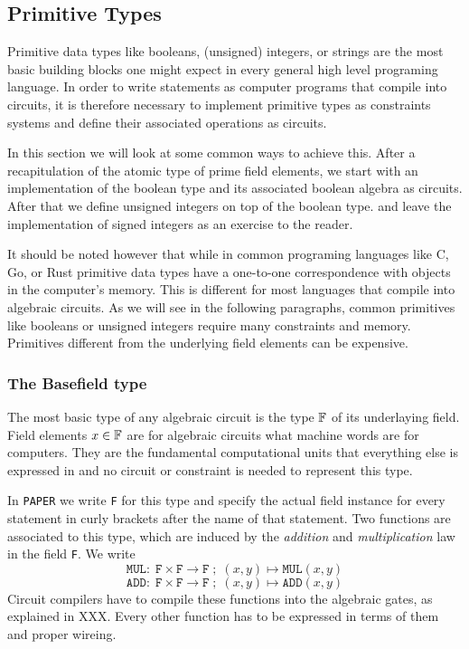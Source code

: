 \subsection{Primitive Types} 
Primitive data types like booleans, (unsigned) integers, or strings  are the most basic building blocks one might expect in every general high level programing language. In order to write statements as computer programs that compile into circuits, it is therefore necessary to implement primitive types as constraints systems and define their associated operations as circuits.

In this section we will look at some common ways to achieve this. After a recapitulation of the atomic type of prime field elements, we start with an implementation of the boolean type and its associated boolean algebra as circuits. After that we define unsigned integers on top of the boolean type. and leave the implementation of signed integers as an exercise to the reader. 

It should be noted however that while in common programing languages like C, Go, or Rust primitive data types have a one-to-one correspondence with objects in the computer's memory. This is different for most languages that compile into algebraic circuits. As we will see in the following paragraphs, common primitives like booleans or unsigned integers require many constraints and memory. Primitives different from the underlying field elements can be expensive.

\subsubsection{The Basefield type} 
The most basic type of any algebraic circuit is the type $\mathbb{F}$ of its underlaying field. Field elements $x\in\mathbb{F}$ are for algebraic circuits what machine words are for computers. They are the fundamental computational units that everything else is expressed in and no circuit or constraint is needed to represent this type. 

In \texttt{PAPER} we write \texttt{F} for this type and specify the actual field instance for every statement in curly brackets after the name of that statement. Two functions are associated to this type, which are induced by the \textit{addition} and \textit{multiplication} law in the field \texttt{F}. We write
\begin{equation}
\mathtt{MUL}:\; \mathtt{F} \times \mathtt{F} \to \mathtt{F}\;;\; (x,y) \mapsto \mathtt{MUL}(x,y)
\end{equation}
\begin{equation}
\mathtt{ADD}:\; \mathtt{F} \times \mathtt{F} \to \mathtt{F}\;;\; (x,y) \mapsto \mathtt{ADD}(x,y)
\end{equation}
Circuit compilers have to compile these functions into the algebraic gates, as explained in XXX. Every other function has to be expressed in terms of them and proper wireing.

